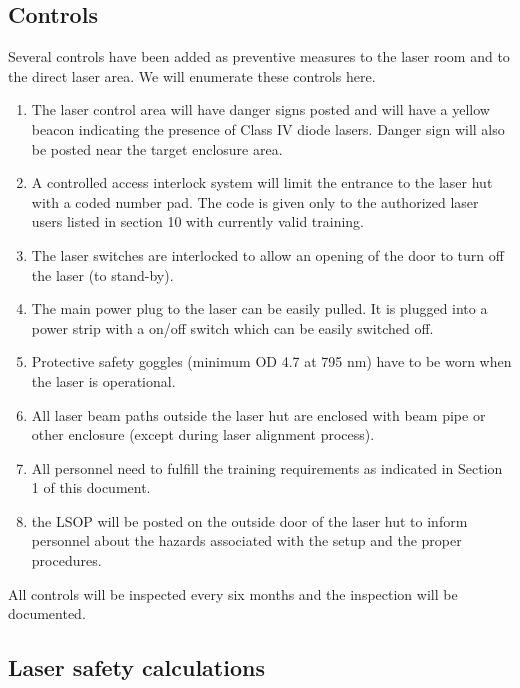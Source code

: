 \subsection{Controls}

Several controls have been added as preventive measures to the laser room 
and to the direct laser area. We will enumerate these controls here.
\begin {enumerate}
\item The laser control area will have danger signs posted and will have a
yellow beacon indicating the presence of Class IV diode lasers. Danger sign will also be posted near the target enclosure area.
\item A controlled access interlock system will limit the entrance to the laser hut with a coded number pad. The code is given only to the authorized 
laser users listed in section 10 with currently valid training. 
\item The laser switches are interlocked to allow an opening of the door to 
turn off the laser (to stand-by). 
\item The main power plug to the laser can be easily pulled. It is plugged
into a power strip with a on/off switch which can be easily switched off.
\item Protective safety goggles (minimum OD 4.7 at 795 nm)
have to be worn when the laser is operational.
\item All laser beam paths outside the laser hut are enclosed with beam pipe or
other enclosure (except during laser alignment process).
\item All personnel need to fulfill the training requirements as indicated in Section 1 of this document.
\item the LSOP will be posted on the outside door of the laser hut to inform 
personnel about the
hazards associated with the setup and the proper procedures.
\end {enumerate}

All controls will be inspected every six months
and the inspection will be documented.

\subsection{Laser safety calculations}

